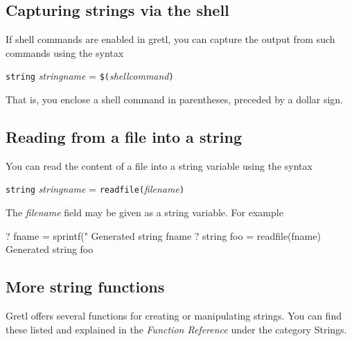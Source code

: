 \subsection{Capturing strings via the shell}

If shell commands are enabled in gretl, you can capture the
output from such commands using the syntax 

\texttt{string} \textsl{stringname} = \texttt{\$(}\textsl{shellcommand}\texttt{)}

That is, you enclose a shell command in parentheses, preceded by
a dollar sign.

\subsection{Reading from a file into a string}

You can read the content of a file into a string variable using
the syntax

\texttt{string} \textsl{stringname} = \texttt{readfile(}\textsl{filename}\texttt{)}

The \textsl{filename} field may be given as a string variable.  For
example
%
\begin{code}
? fname = sprintf("%
Generated string fname
? string foo = readfile(fname)
Generated string foo
\end{code}

\subsection{More string functions}

Gretl offers several functions for creating or manipulating
strings. You can find these listed and explained in the
\textit{Function Reference} under the category \textsf{Strings}.
    

